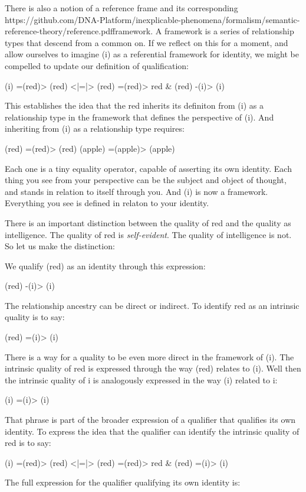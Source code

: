 \documentclass[runningheads]{llncs}
\begin{document}
There is also a notion of a reference frame and its corresponding {https://github.com/DNA-Platform/inexplicable-phenomena/formalism/semantic-reference-theory/reference.pdf}{framework}. A framework is a series of relationship types that descend from a common on. If we reflect on this for a moment, and allow ourselves to imagine (i) as a referential framework for identity, we might be compelled to update our definition of qualification:

(i) =(red)> (red) <|=|> (red) =(red)> red \& (red) -(i)> (i)

This establishes the idea that the red inherits its definiton from (i) as a relationship type in the framework that defines the perspective of (i). And inheriting from (i) as a relationship type requires:

(red) =(red)> (red)
(apple) =(apple)> (apple)

Each one is a tiny equality operator, capable of asserting its own identity. Each thing you see from your perspective can be the subject and object of thought, and stands in relation to itself through you. And (i) is now a framework. Everything you see is defined in relaton to your identity. 

There is an important distinction between the quality of red and the quality as intelligence. The quality of red is \emph{self-evident}. The quality of intelligence is not. So let us make the distinction:

We qualify (red) as an identity through this expression:

(red) -(i)> (i)

The relationship ancestry can be direct or indirect. To identify red as an intrinsic quality is to say:

(red) =(i)> (i)

There is a way for a quality to be even more direct in the framework of (i). The intrinsic quality of red is expressed through the way (red) relates to (i). Well then the intrinsic quality of i is analogously expressed in the way (i) related to i: 

(i) =(i)> (i)

That phrase is part of the broader expression of a qualifier that qualifies its own identity. To express the idea that the qualifier can identify the intrinsic quality of red is to say:

(i) =(red)> (red) <|=|> (red) =(red)> red \& (red) =(i)> (i)

The full expression for the qualifier qualifying its own identity is:
\end{document}
